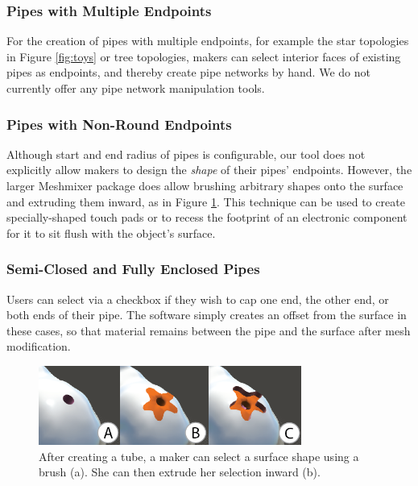 \subsubsection{Pipes with Multiple Endpoints}
For the creation of pipes with multiple endpoints, for example the star topologies in Figure \ref{fig:toys} or tree topologies, makers can select interior faces of existing pipes as endpoints, and thereby create pipe networks by hand.  We do not currently offer any pipe network manipulation tools.


\subsubsection{Pipes with Non-Round Endpoints}
Although start and end radius of pipes is configurable, our tool does not explicitly allow makers to design the \emph{shape} of their pipes' endpoints.  However, the larger Meshmixer package does allow brushing arbitrary shapes onto the surface and extruding them inward, as in Figure \ref{fig:meshmixer-endpoint}.  This technique can be used to create specially-shaped touch pads or to recess the footprint of an electronic component for it to sit flush with the object's surface.

\subsubsection{Semi-Closed and Fully Enclosed Pipes}
Users can select via a checkbox if they wish to cap one end, the other end, or both ends of their pipe.  The software simply creates an offset from the surface in these cases, so that material remains between the pipe and the surface after mesh modification.

\begin{figure}[h!]
\centering
    \includegraphics[width=3.4in]{figures/meshmixer-endpoint.png}
\caption{After creating a tube, a maker can select a surface shape using a brush (a).  She can then extrude her selection inward (b).}
\label{fig:meshmixer-endpoint}
\end{figure}

